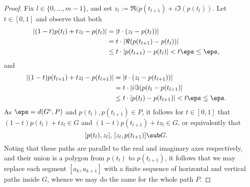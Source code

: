 \documentclass[12pt]{article}
\begin{document}
\begin{homeworkProblem}
\begin{proof}
   Fix $ l\in \{0,\ldots, m-1\} $, and set $ z_{l}:= \Re(p(t_{l+1}) + i\Im(p(t_{l})) $. Let $ t\in [0,1] $ and observe that both 
   \begin{align*}
     |(1-t)p(t_{l}) +t z_{l} - p(t_{l})| &= |t\cdot(z_{l} - p(t_{l})) | \\
     &= t\cdot|\Re(p(t_{l+1})-p(t_{l}))| \\
     &\leq t\cdot|p(t_{l+1})-p(t_{l})|  < t \eps \leq \eps,
   \end{align*}
   and 
    \begin{align*}
     |(1-t)p(t_{l+1}) +t z_{l} - p(t_{l+1})| &= |t\cdot(z_{l} - p(t_{l+1})) | \\
     &= t\cdot|i\Im(p(t_{l}-p(t_{l+1})| \\
     &\leq t\cdot|p(t_{l})-p(t_{l+1})|  < t \eps \leq \eps.
   \end{align*}
   As $ \eps = d(G^{c},P) $ and $ p(t_{l}), p(t_{l+1}) \in P $, it follows for $ t\in [0,1] $ that $ (1-t)p(t_{l}) + tz_{l} \in G $ and $ (1-t)p(t_{l+1}) + tz_{l} \in G $, or equivalently that
   \[
     [p(t_{l}), z_{l}],\,[z_{l}, p(t_{l+1})] \sub G .
   \]
   Noting that these paths are parallel to the real and imaginary axes respectively, and their union is a polygon from $ p(t_{l}) $ to $ p(t_{l+1}) $, it follows that we may replace each segment $ [a_{k},a_{k+1}] $  with a finite sequence of horizontal and vertical paths inside $ G $, whence we may do the same for the whole path $ P $.
 \end{proof}
\end{homeworkProblem}
\end{document}
